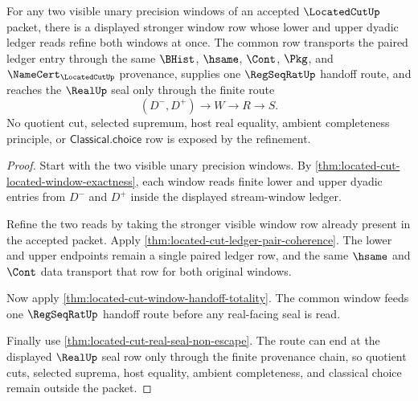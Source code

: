 \begin{theorem}
\label{thm:located-cut-common-window-refinement}
For any two visible unary precision windows of an accepted $\LocatedCutUp$
packet, there is a displayed stronger window row whose lower and upper dyadic
ledger reads refine both windows at once. The common row transports the paired
ledger entry through the same $\BHist$, $\hsame$, $\Cont$, $\Pkg$, and
$\NameCert_{\LocatedCutUp}$ provenance, supplies one $\RegSeqRatUp$ handoff
route, and reaches the $\RealUp$ seal only through the finite route
$$
(D^{-},D^{+}) \longrightarrow W \longrightarrow R \longrightarrow S .
$$
No quotient cut, selected supremum, host real equality, ambient completeness
principle, or $\mathsf{Classical.choice}$ row is exposed by the refinement.
\end{theorem}
\begin{proof}
Start with the two visible unary precision windows. By
\autoref{thm:located-cut-located-window-exactness}, each window reads finite
lower and upper dyadic entries from $D^{-}$ and $D^{+}$ inside the displayed
stream-window ledger.

Refine the two reads by taking the stronger visible window row already present
in the accepted packet. Apply
\autoref{thm:located-cut-ledger-pair-coherence}. The lower and upper endpoints
remain a single paired ledger row, and the same $\hsame$ and $\Cont$ data
transport that row for both original windows.

Now apply \autoref{thm:located-cut-window-handoff-totality}. The common window
feeds one $\RegSeqRatUp$ handoff route before any real-facing seal is read.

Finally use \autoref{thm:located-cut-real-seal-non-escape}. The route can end
at the displayed $\RealUp$ seal row only through the finite provenance chain,
so quotient cuts, selected suprema, host equality, ambient completeness, and
classical choice remain outside the packet.
\end{proof}

